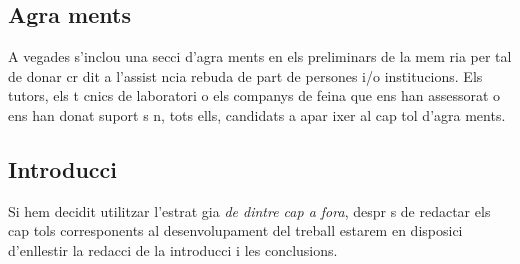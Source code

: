 \subsection{Agra ments}

A vegades s'inclou una secci  d'agra ments en els preliminars de la mem ria per tal de donar cr dit a l'assist ncia rebuda de part de persones i/o institucions. Els tutors, els t cnics de laboratori o els companys de feina que ens han assessorat o ens han donat suport s n, tots ells, candidats a apar ixer al cap tol d'agra ments.

\subsection{Introducci }

Si hem decidit utilitzar l'estrat gia \emph{de dintre cap a fora}, despr s de redactar els cap tols corresponents al desenvolupament del treball estarem en disposici  d'enllestir la redacci  de la introducci  i les conclusions.

